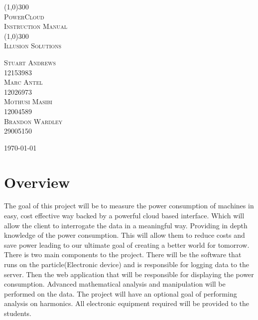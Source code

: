 \documentclass[a4paper,10pt]{article}
\author{Illusion Solutions}
\begin{document}
	
	\begin{titlepage}
		\begin{center}
			\line(1,0){300} \\
			[0.1cm]
			\textsc{\Huge
				PowerCloud\\
				Instruction Manual
			} \\
			\line(1,0){300} \\
			[2.0cm]
			\textsc{\Large
				Illusion Solutions
			} \\
			[3.5cm]
			
		\end{center}
		\begin{flushright}
			\textsc{\Large
				Stuart Andrews\\ 
				12153983\\
				Marc Antel\\
				12026973\\
				Mothusi Masibi\\
				12004589\\
				Brandon Wardley\\
				29005150\\
				[4.0cm]
			}
		\end{flushright}
		\begin{center}
			\today
		\end{center}
	\end{titlepage}
	
	\newpage
	\tableofcontents
	\thispagestyle{empty}
	\newpage
	
	\section{Overview}
	The goal of this project will be to measure the power consumption of machines
	in easy, cost effective way backed by a powerful cloud based interface. Which
	will allow the client to interrogate the data in a meaningful way. Providing in
	depth knowledge of the power consumption. This will allow them to reduce
	costs and save power leading to our ultimate goal of creating a better world
	for tomorrow. There is two main components to the project. There will be
	the software that runs on the particle(Electronic device) and is responsible for
	logging data to the server. Then the web application that will be responsible
	for displaying the power consumption. Advanced mathematical analysis and
	manipulation will be performed on the data. The project will have an optional
	goal of performing analysis on harmonics. All electronic equipment required
	will be provided to the students.
\end{document}
